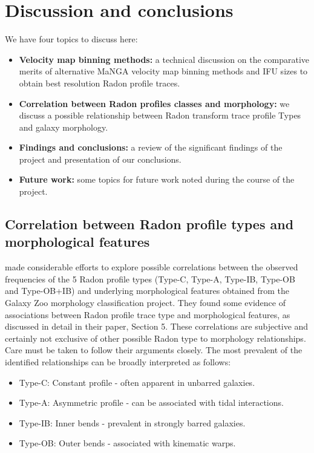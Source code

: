 \section{Discussion and conclusions}
\label{sec:discussion}
We have four topics to discuss here:
\begin{itemize}
\item \textbf{Velocity map binning methods:} a technical discussion on the comparative merits of alternative MaNGA velocity map binning methods and IFU sizes to obtain best resolution Radon profile traces.
\item \textbf{Correlation between Radon profiles classes and morphology:} we discuss a possible relationship between Radon transform trace profile Types and galaxy morphology.
\item \textbf{Findings and conclusions:} a review of the significant findings of the project and presentation of our conclusions.
\item \textbf{Future work:} some topics for future work noted during the course of the project. 
\end{itemize}



\subsection[Correlation between Radon profiles and morphology]{Correlation between Radon profile types and morphological features}
\label{sec:correlations}
\cite{2018MNRAS.480.2217S} made considerable efforts to explore  possible correlations between the observed frequencies of the 5 Radon profile types (Type-C, Type-A, Type-IB, Type-OB and Type-OB+IB) and underlying morphological features obtained from the Galaxy Zoo morphology classification project. They found some evidence of associations between Radon profile trace type and morphological features, as discussed in detail in their paper, Section 5. These correlations are subjective and certainly not exclusive of other possible Radon type to morphology relationships. Care must be taken to follow their arguments closely. The most prevalent of the identified relationships can be broadly interpreted as follows:
\begin{itemize}
\item Type-C: Constant profile - often apparent in unbarred galaxies.
\item Type-A: Asymmetric profile - can be associated with tidal interactions.
\item Type-IB: Inner bends - prevalent in strongly barred galaxies.
\item Type-OB: Outer bends - associated with kinematic warps.
\end{itemize}

